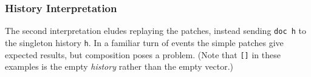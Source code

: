 \subsubsection{History Interpretation}

The second interpretation eludes replaying the patches, instead sending \texttt{doc h}
to the singleton history \texttt{h}. In a familiar turn of events the simple patches give
expected results, but composition poses a problem. (Note that \texttt{[]} in these examples
is the empty \emph{history} rather than the empty vector.)

\begin{code}%
%
\>[2]\AgdaFunction{\AgdaUnderscore{}}\AgdaSpace{}%
\AgdaSymbol{:}\AgdaSpace{}%
\AgdaSpace{}%
\AgdaSpace{}%
\AgdaSymbol{(}\AgdaSpace{}%
\AgdaInductiveConstructor{[]}\AgdaSymbol{)}\AgdaSpace{}%
\AgdaSpace{}%
\AgdaSpace{}%
\AgdaSymbol{(}\AgdaSpace{}%
\AgdaSpace{}%
\AgdaSpace{}%
\AgdaSpace{}%
\AgdaOperator{\AgdaInductiveConstructor{::}}\AgdaSpace{}%
\AgdaInductiveConstructor{[]}\AgdaSymbol{)}\<%
\\
%
\>[2]\AgdaSymbol{\AgdaUnderscore{}}\AgdaSpace{}%
\AgdaSymbol{=}\AgdaSpace{}%
\AgdaSpace{}%
\AgdaSymbol{\AgdaUnderscore{}}\<%
\\
%
\\[\AgdaEmptyExtraSkip]%
%
\>[2]\AgdaFunction{\AgdaUnderscore{}}%
\>[572I]\AgdaSymbol{:}\AgdaSpace{}%
\AgdaSpace{}%
\AgdaSpace{}%
\AgdaSymbol{(}\AgdaSpace{}%
\AgdaSymbol{(}\AgdaSpace{}%
\AgdaSpace{}%
\AgdaSpace{}%
\AgdaSpace{}%
\AgdaOperator{\AgdaInductiveConstructor{::}}\AgdaSpace{}%
\AgdaInductiveConstructor{[]}\AgdaSymbol{))}\<%
\\
\>[.][@{}l@{}]\<[572I]%
\>[4]\AgdaSpace{}%
\AgdaSpace{}%
\AgdaSymbol{(}\AgdaSpace{}%
\AgdaSpace{}%
\AgdaOperator{\AgdaInductiveConstructor{::}}\AgdaSpace{}%
\AgdaSymbol{(}\AgdaSpace{}%
\AgdaSpace{}%
\AgdaSpace{}%
\AgdaSpace{}%
\AgdaOperator{\AgdaInductiveConstructor{::}}\AgdaSpace{}%
\AgdaInductiveConstructor{[]}\AgdaSymbol{))}\<%
\\
%
\>[2]\AgdaSymbol{\AgdaUnderscore{}}\AgdaSpace{}%
\AgdaSymbol{=}\AgdaSpace{}%
\AgdaSpace{}%
\AgdaSymbol{\AgdaUnderscore{}}\<%
\end{code}

